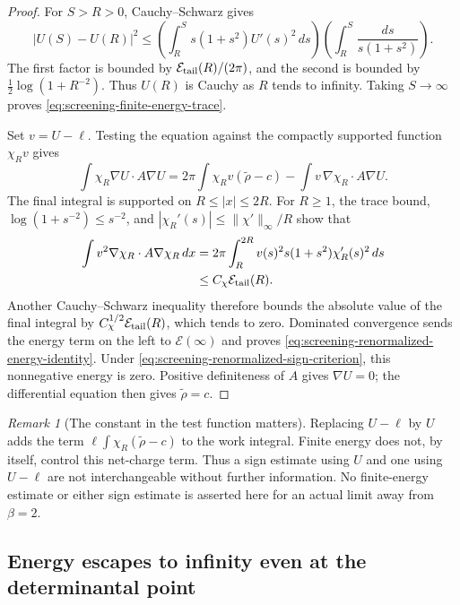 \documentclass[11pt,a4paper]{article}
\numberwithin{equation}{section}
\theoremstyle{definition}
\theoremstyle{remark}
\newtheorem{remark}[theorem]{Remark}
\begin{document}
\begin{proof}
For $S>R>0$, Cauchy--Schwarz gives
\[
 |U(S)-U(R)|^2
 \le\left(\int_R^S s(1+s^2)U'(s)^2\,ds\right)
     \left(\int_R^S\frac{ds}{s(1+s^2)}\right).
\]
The first factor is bounded by
$\mathcal E_{\rm tail}(R)/(2\pi)$, and the second is bounded by
$\tfrac12\log(1+R^{-2})$.  Thus $U(R)$ is Cauchy as $R$ tends
to infinity.  Taking $S\to\infty$ proves
\eqref{eq:screening-finite-energy-trace}.

Set $v=U-\ell$.  Testing the equation against the compactly
supported function $\chi_Rv$ gives
\[
 \int\chi_R\nabla U\cdot A\nabla U
 =2\pi\int\chi_Rv(\widetilde\rho-c)
       -\int v\,\nabla\chi_R\cdot A\nabla U.
\]
The final integral is supported on $R\le |x|\le2R$.  For $R\ge1$,
the trace bound, $\log(1+s^{-2})\le s^{-2}$, and
$|\chi_R'(s)|\le\|\chi'\|_\infty/R$ show that
\begin{align*}
 \int v^2\nabla\chi_R\cdot A\nabla\chi_R\,dx
 &=2\pi\int_R^{2R}v(s)^2s(1+s^2)\chi_R'(s)^2\,ds\\
 &\le C_\chi\mathcal E_{\rm tail}(R).
\end{align*}
Another Cauchy--Schwarz inequality therefore bounds the absolute
value of the final integral by
$C_\chi^{1/2}\mathcal E_{\rm tail}(R)$, which tends to zero.
Dominated convergence sends the energy term on the left to
$\mathcal E(\infty)$ and proves
\eqref{eq:screening-renormalized-energy-identity}.  Under
\eqref{eq:screening-renormalized-sign-criterion}, this nonnegative
energy is zero.  Positive definiteness of $A$ gives $\nabla U=0$;
the differential equation then gives $\widetilde\rho=c$.
\end{proof}

\begin{remark}[The constant in the test function matters]
Replacing $U-\ell$ by $U$ adds the term
$\ell\int\chi_R(\widetilde\rho-c)$ to the work integral.
Finite energy does not, by itself, control this net-charge term.
Thus a sign estimate using $U$ and one using $U-\ell$ are not
interchangeable without further information.  No finite-energy
estimate or either sign estimate is asserted here for an actual
limit away from $\beta=2$.
\end{remark}

\subsection{Energy escapes to infinity even at the determinantal point}
\label{subsec:screening-beta2-energy-escape}
\end{document}
